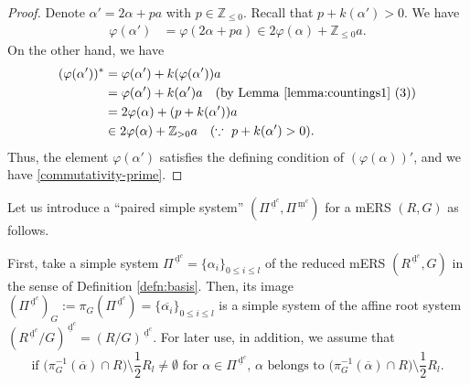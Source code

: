 \documentclass[11pt]{amsart}
\newcommand{\Z}{\mathbb{Z}}
\newcommand{\dc}{\,\underline{\mathrm{d}}^c}
\newcommand{\mc}{\, \underline{\mathrm{m}}^c}
\begin{document}
{\begin{proof}
Denote $\alpha'=2\alpha+pa$ with $p\in\Z_{\leq 0}$. Recall that 
$p+k(\alpha')>0$. We have
\[\begin{aligned}
\varphi(\alpha')&=\varphi(2\alpha+pa)\in 2\varphi(\alpha)+\Z_{\leq 0}a.
\end{aligned}\]
On the other hand, we have
\[\begin{aligned}
(\varphi(\alpha'))^*&=\varphi(\alpha')+k(\varphi(\alpha'))a\\
&=\varphi(\alpha')+k(\alpha')a \quad (\text{by Lemma \ref{lemma:countings1} (3)})\\
&=2\varphi(\alpha)+(p+k(\alpha'))a\\
&\in 2\varphi(\alpha)+\Z_{>0}a\quad (\because\ p+k(\alpha')>0).
\end{aligned}\]
Thus, the element $\varphi(\alpha')$ satisfies the defining
condition of $(\varphi(\alpha))'$, and we have \eqref{commutativity-prime}.
\end{proof}
\medskip 
Let us introduce a ``paired simple system'' $(\Pi^{\dc},\Pi^{\mc})$ for a mERS $(R,G)$ 
as follows. 

First, take a simple system 
$\Pi^{\dc}=\{\alpha_i\}_{0\leq i\leq l}$\index[notations]{p711@$\Pi^{\dc}$} 
of the reduced 
mERS $(R^{\dc},G)$ in the sense of Definition \ref{defn:basis}. 
Then, its image $(\Pi^{\dc})_G:=\pi_G(\Pi^{\dc})=\{\overline{\alpha_i}\}_{0\leq i\leq l}$
is a simple system of the affine root system $(R^{\dc}/G)^{\dc}=(R/G)^{\dc}$.  
For later use, in addition, we assume that
\begin{equation}\label{condition-Pi'}
\text{if $\big(\pi_G^{-1}(\overline{\alpha})\cap R\big)
\setminus \frac12 R_l\ne\emptyset$ 
for $\alpha\in \Pi^{\dc}$, $\alpha$ belongs to 
$\big(\pi_G^{-1}(\overline{\alpha})\cap R\big) \setminus \frac12 R_l$.}
\end{equation}

}
\end{document}

